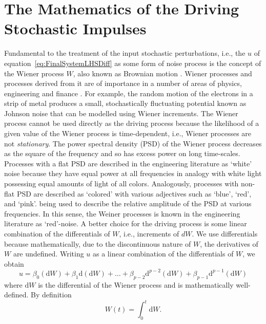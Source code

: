 \documentclass[a4paper,fleqn,usenatbib]{mnras}
\begin{document}
\section[Stochastic Impulses Mathematics]{The Mathematics of the Driving Stochastic Impulses}\label{sec:RHS}

Fundamental to the treatment of the input stochastic perturbations, i.e., the $u$ of equation~\eqref{eq:FinalSystemLHSDiff} as some form of noise process is the concept of the Wiener process $W$, also known as Brownian motion \citep{Doob,Davis,Jacobs,Oksendal}. Wiener processes and processes derived from it are of importance in a number of areas of physics, engineering and finance \citep{Jacobs}. For example, the random motion of the electrons in a strip of metal produces a small, stochastically fluctuating potential known as Johnson noise \citep{Gillespie96} that can be modelled using Wiener increments. The Wiener process cannot be used directly as the driving process because the likelihood of a given value of the Wiener process is time-dependent, i.e., Wiener processes are not \textit{stationary}. The power spectral density (PSD) of the Wiener process decreases as the square of the frequency and so has excess power on long time-scales. Processes with a flat PSD are described in the engineering literature as `white' noise because they have equal power at all frequencies in analogy with white light possessing equal amounts of light of all colors. Analogously, processes with non-flat PSD are described as `colored' with various adjectives such as `blue', `red', and `pink'. being used to describe the relative amplitude of the PSD at various frequencies. In this sense, the Weiner processes is known in the engineering literature as `red'-noise. A better choice for the driving process is some linear combination of the differentials of $W$, i.e., increments of $dW$. We use differentials because mathematically, due to the discontinuous nature of $W$, the derivatives of $W$ are undefined. Writing $u$ as a linear combination of the differentials of $W$, we obtain
\begin{equation}\label{eq:FinalSystemRHSDiff}
u = \beta_{0} (\mathrm{d}W) + \beta_{1} \mathrm{d}(\mathrm{d}W) + \ldots + \beta_{p-2} \mathrm{d}^{p-2}(\mathrm{d}W) + \beta_{p-1} \mathrm{d}^{p-1}(\mathrm{d}W)
\end{equation}
where $\mathrm{d}W$ is the differential of the Wiener process and is mathematically well-defined. By definition
\begin{equation}\label{eq:WienerIncr}
W(t) = \int_{0}^{t} \mathrm{d}W.
\end{equation}
\end{document}
